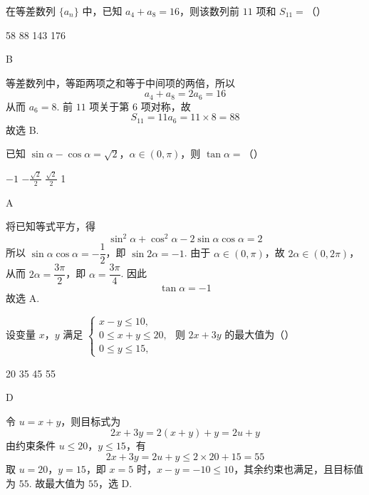 \begin{problem}
在等差数列 \(\{a_{n}\}\) 中，已知 \(a_{4} + a_{8} = 16\)，则该数列前 \(11\) 项和 \(S_{11} =\)（\quad）

\choices
    {58}
    {88}
    {143}
    {176}
\end{problem}

\begin{answer}
B
\end{answer}

\begin{solution}
等差数列中，等距两项之和等于中间项的两倍，所以
\[
a_4+a_8=2a_6=16
\]
从而 \(a_6=8\). 前 \(11\) 项关于第 \(6\) 项对称，故
\[
S_{11}=11a_6=11\times8=88
\]
故选 B.
\end{solution}

\begin{problem}
已知 \(\sin \alpha - \cos \alpha = \sqrt{2}\)，\(\alpha \in (0, \pi)\)，则 \(\tan \alpha =\)（\quad）

\choices
    {\(-1\)}
    {\(-\frac{\sqrt{2}}{2}\)}
    {\(\frac{\sqrt{2}}{2}\)}
    {1}
\end{problem}

\begin{answer}
A
\end{answer}

\begin{solution}
将已知等式平方，得
\[
\sin^2\alpha+\cos^2\alpha-2\sin\alpha\cos\alpha=2
\]
所以 \(\sin\alpha\cos\alpha=-\dfrac12\)，即 \(\sin 2\alpha=-1\). 由于 \(\alpha\in(0,\pi)\)，故 \(2\alpha\in(0,2\pi)\)，从而 \(2\alpha=\dfrac{3\pi}{2}\)，即 \(\alpha=\dfrac{3\pi}{4}\). 因此
\[
\tan\alpha=-1
\]
故选 A.
\end{solution}

\begin{problem}
设变量 \(x\)，\(y\) 满足 \(\begin{cases}
x - y \leqslant 10,\\
0 \leqslant x + y \leqslant 20,\\
0 \leqslant y \leqslant 15,
\end{cases}\) 则 \(2x + 3y\) 的最大值为（\quad）

\choices
    {20}
    {35}
    {45}
    {55}
\end{problem}

\begin{answer}
D
\end{answer}

\begin{solution}
令 \(u=x+y\)，则目标式为
\[
2x+3y=2(x+y)+y=2u+y
\]
由约束条件 \(u\leqslant20\)，\(y\leqslant15\)，有
\[
2x+3y=2u+y\leqslant2\times20+15=55
\]
取 \(u=20\)，\(y=15\)，即 \(x=5\) 时，\(x-y=-10\leqslant10\)，其余约束也满足，且目标值为 \(55\). 故最大值为 \(55\)，选 D.
\end{solution}

